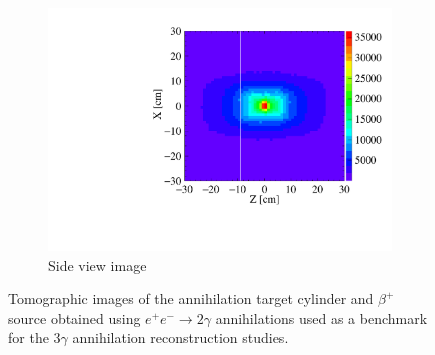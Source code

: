 \begin{figure}[h!]
  \begin{subfigure}{0.45\textwidth}
  \includegraphics[width=1.0\textwidth]{Chapter8_analysis_jpet/img/2g_xz_all}
  \caption{Side view image}\label{fig:2g_image_b}
\end{subfigure}
  \caption{Tomographic images of the annihilation target cylinder and $\beta^+$ source obtained using $e^+e^-\to 2\gamma$ annihilations used as a benchmark for the 3$\gamma$ annihilation reconstruction studies.}\label{fig:2g_image}
\end{figure}

